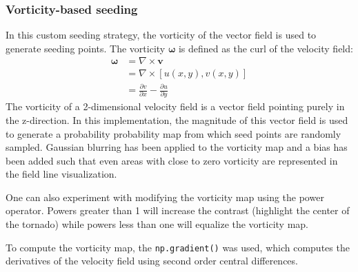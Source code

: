 \documentclass{article}
\begin{document}
\subsubsection{Vorticity-based seeding}
In this custom seeding strategy, the vorticity of the vector field is used
to generate seeding points. The vorticity $\mathbf{\omega}$ is defined as the curl of the velocity field:
\begin{align*}
    \mathbf{\omega} &= \nabla \times \mathbf{v} \\
    &= \nabla \times \left[u(x, y), v(x, y)\right] \\
    &= \frac{\partial v}{\partial x} - \frac{\partial u}{ \partial y}
\end{align*}
The vorticity of a 2-dimensional velocity field is a vector field pointing purely in the z-direction. In this implementation, 
the magnitude of this vector field is used to generate a probability probability map from which seed points are randomly sampled.
Gaussian blurring has been applied to the vorticity map and a bias has been added such that even areas with close to zero vorticity are 
represented in the field line visualization.

One can also experiment with modifying the vorticity map using the power operator. Powers greater than 1 will increase the contrast
(highlight the center of the tornado) while powers less than one will equalize the vorticity map.

To compute the vorticity map, the \verb|np.gradient()| was used, which computes the derivatives of the velocity field
using second order central differences.
\end{document}
